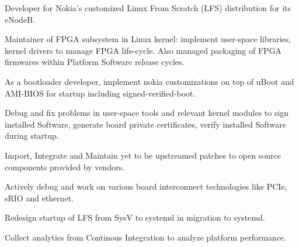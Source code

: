     {%
		\begin{cvitems} %
		\item {Developer for Nokia's customized Linux From Scratch (LFS) distribution for its eNodeB.}
		\item {Maintainer of FPGA subsystem in Linux kernel: implement user-space libraries, kernel drivers to manage FPGA life-cycle. Also managed packaging of FPGA firmwares within Platform Software release cycles.}
		\item {As a bootloader developer, implement nokia customizations on top of uBoot and AMI-BIOS for startup including signed-verified-boot.}
		\item {Debug and fix problems in user-space tools and relevant kernel modules to sign installed Software, generate board private certificates, verify installed Software during startup.}
		\item {Import, Integrate and Maintain yet to be upstreamed patches to open source components provided by vendors.}
		\item {Actively debug and work on various board interconnect technologies like PCIe, sRIO and ethernet.}
		\item {Redesign startup of LFS from SysV to systemd in migration to systemd.}
		\item {Collect analytics from Continous Integration to analyze platform performance.}
		\end{cvitems}
  }
